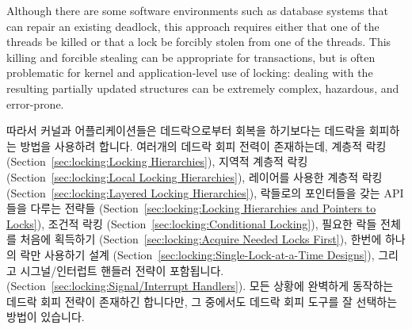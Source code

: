Although there are some software environments such as database systems
that can repair an existing deadlock, this approach requires either that
one of the threads be killed or that a lock be forcibly stolen from one
of the threads.
This killing and forcible stealing can be appropriate for transactions,
but is often problematic for kernel and application-level use of locking:
dealing with the resulting partially updated structures can be extremely
complex, hazardous, and error-prone.
\fi

따라서 커널과 어플리케이션들은 데드락으로부터 회복을 하기보다는 데드락을
회피하는 방법을 사용하려 합니다.
여러개의 데드락 회피 전력이 존재하는데, 계층적 락킹
(Section~\ref{sec:locking:Locking Hierarchies}),
지역적 계층적 락킹
(Section~\ref{sec:locking:Local Locking Hierarchies}),
레이어를 사용한 계층적 락킹
(Section~\ref{sec:locking:Layered Locking Hierarchies}),
락들로의 포인터들을 갖는 API 들을 다루는 전략들
(Section~\ref{sec:locking:Locking Hierarchies and Pointers to Locks}),
조건적 락킹
(Section~\ref{sec:locking:Conditional Locking}),
필요한 락들 전체를 처음에 획득하기
(Section~\ref{sec:locking:Acquire Needed Locks First}),
한번에 하나의 락만 사용하기 설계
(Section~\ref{sec:locking:Single-Lock-at-a-Time Designs}),
그리고 시그널/인터럽트 핸들러 전략이 포함됩니다.
(Section~\ref{sec:locking:Signal/Interrupt Handlers}).
모든 상황에 완벽하게 동작하는 데드락 회피 전략이 존재하긴 합니다만, 그 중에서도
데드락 회피 도구를 잘 선택하는 방법이 있습니다.

